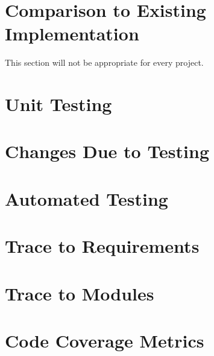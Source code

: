 \documentclass[12pt, titlepage]{article}
\begin{document}
	
\section{Comparison to Existing Implementation}	

This section will not be appropriate for every project.

\section{Unit Testing}

\section{Changes Due to Testing}

\section{Automated Testing}
		
\section{Trace to Requirements}
		
\section{Trace to Modules}		

\section{Code Coverage Metrics}




\end{document}
